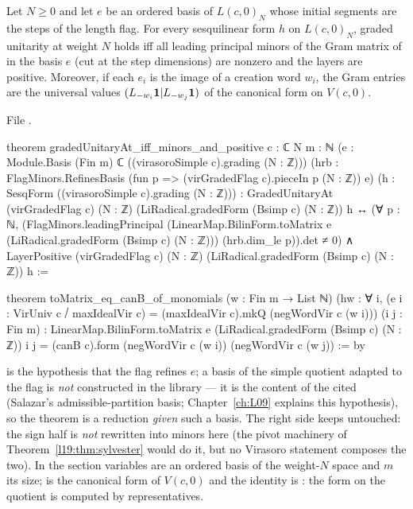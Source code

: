 \begin{theorem}\label{l19:thm:virreduction}
Let $N\ge0$ and let $e$ be an ordered basis of $L(c,0)_N$ whose initial segments are the steps of the
length flag. For every sesquilinear form $h$ on $L(c,0)_N$, graded unitarity at weight $N$ holds iff
all leading principal minors of the Gram matrix of  in the basis $e$ (cut at the step
dimensions) are nonzero and the layers are positive. Moreover, if each $e_i$ is the image of a
creation word $w_i$, the Gram entries are the universal values $(L_{-w_i}\mathbf{1}|L_{-w_j}\mathbf{1})$
of the canonical form on $V(c,0)$.
\end{theorem}

\noindent File .
\begin{leancode}
theorem gradedUnitaryAt_iff_minors_and_positive {c : ℂ} {N m : ℕ}
    (e : Module.Basis (Fin m) ℂ ((virasoroSimple c).grading (N : ℤ)))
    (hrb : FlagMinors.RefinesBasis (fun p => (virGradedFlag c).pieceIn p (N : ℤ)) e)
    (h : SesqForm ((virasoroSimple c).grading (N : ℤ))) :
    GradedUnitaryAt (virGradedFlag c) (N : ℤ) (LiRadical.gradedForm (Bsimp c) (N : ℤ)) h
      ↔ (∀ p : ℕ, (FlagMinors.leadingPrincipal
            (LinearMap.BilinForm.toMatrix e (LiRadical.gradedForm (Bsimp c) (N : ℤ)))
            (hrb.dim_le p)).det ≠ 0) ∧
        LayerPositive (virGradedFlag c) (N : ℤ) (LiRadical.gradedForm (Bsimp c) (N : ℤ)) h :=

theorem toMatrix_eq_canB_of_monomials (w : Fin m → List ℕ)
    (hw : ∀ i, (e i : VirUniv c ⧸ maxIdealVir c)
      = (maxIdealVir c).mkQ (negWordVir c (w i))) (i j : Fin m) :
    LinearMap.BilinForm.toMatrix e (LiRadical.gradedForm (Bsimp c) (N : ℤ)) i j
      = (canB c).form (negWordVir c (w i)) (negWordVir c (w j)) := by
\end{leancode}

\begin{dictionary}
 is the hypothesis that the flag refines $e$; a basis of the simple quotient adapted to the
flag is \emph{not} constructed in the library --- it is the content of the cited
\allowbreak{} (Salazar's admissible-partition basis; Chapter~\ref{ch:L09}
explains this hypothesis), so the theorem is a reduction \emph{given} such a basis. The right side
keeps  untouched: the sign half is \emph{not} rewritten into minors here (the
pivot machinery of Theorem~\ref{l19:thm:sylvester} would do it, but no Virasoro statement composes the
two). In \allowbreak{}\allowbreak{}\allowbreak{}\allowbreak{} the section variables are an ordered basis  of
the weight-$N$ space and $m$ its size;  is the canonical form of $V(c,0)$ and the identity
is : the form on the quotient is computed by representatives.
\end{dictionary}

